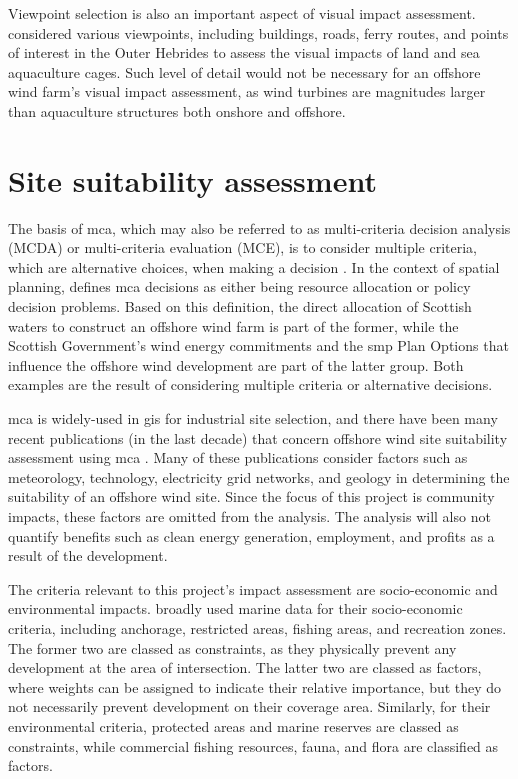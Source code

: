 Viewpoint selection is also an important aspect of visual impact assessment.
\cite{falconer2013} considered various viewpoints, including buildings, roads,
ferry routes, and points of interest in the Outer Hebrides to assess the visual
impacts of land and sea aquaculture cages. Such level of detail would not be
necessary for an offshore wind farm's visual impact assessment, as wind
turbines are magnitudes larger than aquaculture structures both onshore and
offshore.

\section{Site suitability assessment}

The basis of \gls{mca}, which may also be referred to as multi-criteria
decision analysis (MCDA) or multi-criteria evaluation (MCE), is to consider
multiple criteria, which are alternative choices, when making a decision
\autocite{dean2020,eastman2005-mca}. In the context of spatial planning,
\cite{eastman2005-mca} defines \gls{mca} decisions as either being resource
allocation or policy decision problems. Based on this definition, the direct
allocation of Scottish waters to construct an offshore wind farm is part of the
former, while the Scottish Government's wind energy commitments and the
\gls{smp} Plan Options that influence the offshore wind development are part of
the latter group. Both examples are the result of considering multiple criteria
or alternative decisions.

\gls{mca} is widely-used in \gls{gis} for industrial site selection, and there
have been many recent publications (in the last decade) that concern offshore
wind site suitability assessment using \gls{mca}
\autocite{gaveriaux2019,mekonnen2015,vasileiou2017,tercan2020,deveci2020,mahdy2018,basset2021}.
Many of these publications consider factors such as meteorology, technology,
electricity grid networks, and geology in determining
the suitability of an offshore wind site. Since the focus of this project is
community impacts, these factors are omitted from the analysis. The analysis
will also not quantify benefits such as clean energy generation, employment,
and profits as a result of the development.

The criteria relevant to this project's impact assessment are socio-economic
and environmental impacts. \cite{gaveriaux2019} broadly used marine data for
their socio-economic criteria, including anchorage, restricted areas, fishing
areas, and recreation zones. The former two are classed as constraints, as they
physically prevent any development at the area of intersection. The latter two
are classed as factors, where weights can be assigned to indicate their
relative importance, but they do not necessarily prevent development on their
coverage area. Similarly, for their environmental criteria, protected areas and
marine reserves are classed as constraints, while commercial fishing resources,
fauna, and flora are classified as factors.

